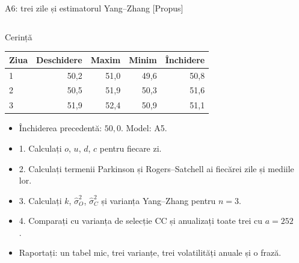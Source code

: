 \begin{frame}{A6: trei zile și estimatorul Yang--Zhang [Propus]}
\propsub
\itemsize{\scriptsize}
\begin{columns}[T]
\begin{column}{\taskw}
\begin{block}{Cerință}
\begin{center}
\scriptsize
\begin{tabular}{lrrrr}
\toprule
\textbf{Ziua} & \textbf{Deschidere} & \textbf{Maxim} & \textbf{Minim} & \textbf{Închidere} \\
\midrule
1 & 50{,}2 & 51{,}0 & 49{,}6 & 50{,}8 \\
2 & 50{,}5 & 51{,}9 & 50{,}3 & 51{,}6 \\
3 & 51{,}9 & 52{,}4 & 50{,}9 & 51{,}1 \\
\bottomrule
\end{tabular}
\end{center}
\begin{itemize}
    \item Închiderea precedentă: $50{,}0$. Model: A5.
    \item 1. Calculați $o$, $u$, $d$, $c$ pentru fiecare zi.
    \item 2. Calculați termenii Parkinson și Rogers--Satchell ai fiecărei zile și mediile lor.
    \item 3. Calculați $k$, $\hat\sigma_O^2$, $\hat\sigma_C^2$ și varianța Yang--Zhang pentru $n = 3$.
    \item 4. Comparați cu varianța de selecție CC și anualizați toate trei cu $a = 252$.
    \item Raportați: un tabel mic, trei varianțe, trei volatilități anuale și o frază.
\end{itemize}
\end{block}
\end{column}
\begin{column}{\solw}
\end{column}
\end{columns}
\end{frame}

